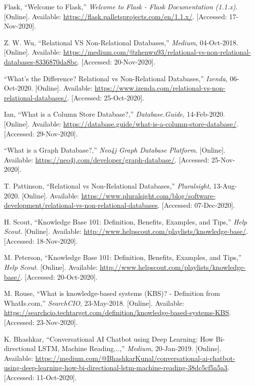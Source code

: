 \documentclass[titlepage, 12pt]{article}
\begin{document}
\begin{thebibliography}{9}
Flask, “Welcome to Flask,” \emph{Welcome to Flask - Flask Documentation (1.1.x)}. [Online]. Available: \url{https://flask.palletsprojects.com/en/1.1.x/}. [Accessed: 17-Nov-2020].


Z. W. Wu, “Relational VS Non-Relational Databases,” \emph{Medium}, 04-Oct-2018. [Online]. Available: \url{https://medium.com/@zhenwu93/relational-vs-non-relational-databases-8336870da8bc}. [Accessed: 20-Nov-2020].

“What's the Difference? Relational vs Non-Relational Databases,” \emph{Izenda}, 06-Oct-2020. [Online]. Available: \url{https://www.izenda.com/relational-vs-non-relational-databases/}. [Accessed: 25-Oct-2020].

Ian, “What is a Column Store Database?,” \emph{Database.Guide}, 14-Feb-2020. [Online]. Available: \url{https://database.guide/what-is-a-column-store-database/}. [Accessed: 29-Nov-2020].

“What is a Graph Database?,” \emph{Neo4j Graph Database Platform}. [Online]. Available: \url{https://neo4j.com/developer/graph-database/}. [Accessed: 25-Nov-2020].

T. Pattinson, “Relational vs Non-Relational Databases,” \emph{Pluralsight}, 13-Aug-2020. [Online]. Available: \url{https://www.pluralsight.com/blog/software-development/relational-vs-non-relational-databases}. [Accessed: 07-Dec-2020].

H. Scout, “Knowledge Base 101: Definition, Benefits, Examples, and Tips,” \emph{Help Scout}. [Online]. Available: \url{http://www.helpscout.com/playlists/knowledge-base/}. [Accessed: 18-Nov-2020].

M. Peterson, “Knowledge Base 101: Definition, Benefits, Examples, and Tips,” \emph{Help Scout}. [Online]. Available: \url{http://www.helpscout.com/playlists/knowledge-base/}. [Accessed: 20-Oct-2020].

M. Rouse, “What is knowledge-based systems (KBS)? - Definition from WhatIs.com,” \emph{SearchCIO}, 23-May-2018. [Online]. Available: \url{https://searchcio.techtarget.com/definition/knowledge-based-systems-KBS}. [Accessed: 23-Nov-2020].

K. Bhashkar, “Conversational AI Chatbot using Deep Learning: How Bi-directional LSTM, Machine Reading...,” \emph{Medium}, 20-Jan-2019. [Online]. Available: \url{https://medium.com/@BhashkarKunal/conversational-ai-chatbot-using-deep-learning-how-bi-directional-lstm-machine-reading-38dc5cf5a5a3}. [Accessed: 11-Oct-2020].


\end{thebibliography}
\end{document}
